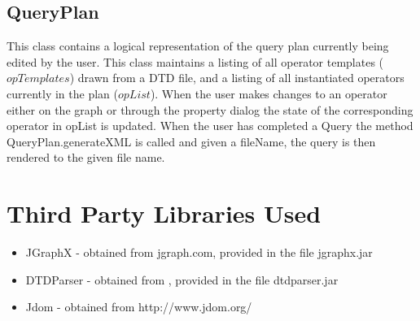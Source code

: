 \documentclass{article}
\begin{document}
\subsection{QueryPlan}  This class contains a logical representation of the query plan currently being edited by the user.  This class maintains a listing of all operator templates ($opTemplates$) drawn from a DTD file, and a listing of all instantiated operators currently in the plan ($opList$).  When the user makes changes to an operator either on the graph or through the property dialog the state of the corresponding operator in opList is updated.  When the user has completed a Query the method QueryPlan.generateXML is called and given a fileName, the query is then rendered to the given file name.
\section{Third Party Libraries Used}
\begin{itemize}
\item JGraphX - obtained from jgraph.com, provided in the file jgraphx.jar
\item DTDParser - obtained from  , provided in the file dtdparser.jar
\item Jdom - obtained from http://www.jdom.org/
\end{itemize}
\end{document}
